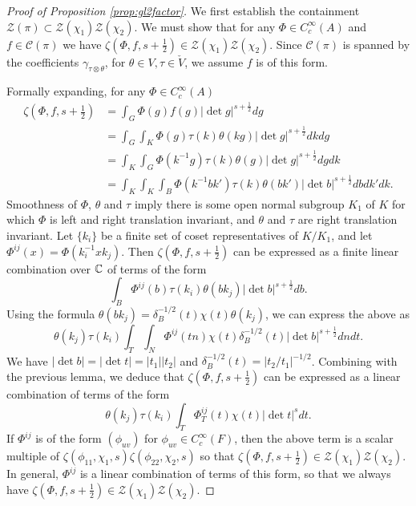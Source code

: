 \begin{proof}[Proof of Proposition \ref{prop:gl2factor}]
    We first establish the containment $\mathcal Z(\pi) \subset \mathcal Z(\chi_1)\mathcal Z(\chi_2)$. We must show that for any $\Phi \in C_c^\infty(A)$ and $f \in \mathcal C(\pi)$ we have $\zeta(\Phi,f,s+\frac{1}{2}) \in \mathcal Z(\chi_1)\mathcal Z(\chi_2)$. Since $\mathcal C(\pi)$ is spanned by the coefficients $\gamma_{\tau \otimes \theta}$, for $\theta \in V, \tau \in \check{V}$, we assume $f$ is of this form.

    Formally expanding, for any $\Phi \in C_c^\infty(A)$
    \begin{equation*}
        \begin{split}
            \zeta\left(\Phi,f,s+\frac{1}{2}\right) &= \int_G \Phi(g)f(g) |\det g|^{s+\frac{1}{2}} dg \\
            &= \int_G \int_K \Phi(g) \tau(k) \theta(kg)|\det g|^{s+\frac{1}{2}} dk dg \\
            &= \int_K \int_G \Phi(k^{-1}g) \tau(k)\theta(g) |\det g|^{s+\frac{1}{2}} dg dk \\
            &= \int_K \int_K \int_B \Phi(k^{-1}bk') \tau(k)\theta(bk') |\det b|^{s+\frac{1}{2}} db dk' dk.
        \end{split}
    \end{equation*}
    Smoothness of $\Phi$, $\theta$ and $\tau$ imply there is some open normal subgroup $K_1$ of $K$ for which $\Phi$ is left and right translation invariant, and $\theta$ and $\tau$ are right translation invariant. Let $\{k_i\}$ be a finite set of coset representatives of $K/K_1$, and let $\Phi^{ij}(x) = \Phi(k_i^{-1}xk_j)$. Then $\zeta(\Phi,f,s+\frac{1}{2})$ can be expressed as a finite linear combination over $\mathbb{C}$ of terms of the form 
    $$\int_B \Phi^{ij}(b) \tau(k_i)\theta(bk_j) |\det b|^{s+\frac{1}{2}} db.$$
    Using the formula $\theta(bk_j) = \delta_B^{-1/2}(t)\chi(t)\theta(k_j)$, we can express the above as
    $$\theta(k_j)\tau(k_i) \int_T\int_N \Phi^{ij}(tn) \chi(t)\delta_B^{-1/2}(t) |\det b|^{s+\frac{1}{2}} dn dt.$$
    We have $|\det b|=|\det t| = |t_1| |t_2|$ and $\delta_B^{-1/2}(t) = |t_2/t_1|^{-1/2}$. Combining with the previous lemma, we deduce that $\zeta(\Phi,f,s+\frac{1}{2})$ can be expressed as a linear combination of terms of the form 
    $$\theta(k_j)\tau(k_i) \int_T \Phi_T^{ij}(t) \chi(t) |\det t|^s dt.$$
    If $\Phi^{ij}$ is of the form $(\phi_{uv})$ for $\phi_{uv} \in C_c^\infty(F)$, then the above term is a scalar multiple of $\zeta(\phi_{11},\chi_1,s)\zeta(\phi_{22},\chi_2,s)$ so that $\zeta(\Phi,f,s+\frac{1}{2}) \in \mathcal Z(\chi_1)\mathcal Z(\chi_2)$. In general, $\Phi^{ij}$ is a linear combination of terms of this form, so that we always have $\zeta(\Phi,f,s+\frac{1}{2}) \in \mathcal Z(\chi_1)\mathcal Z(\chi_2)$.


\end{proof}
